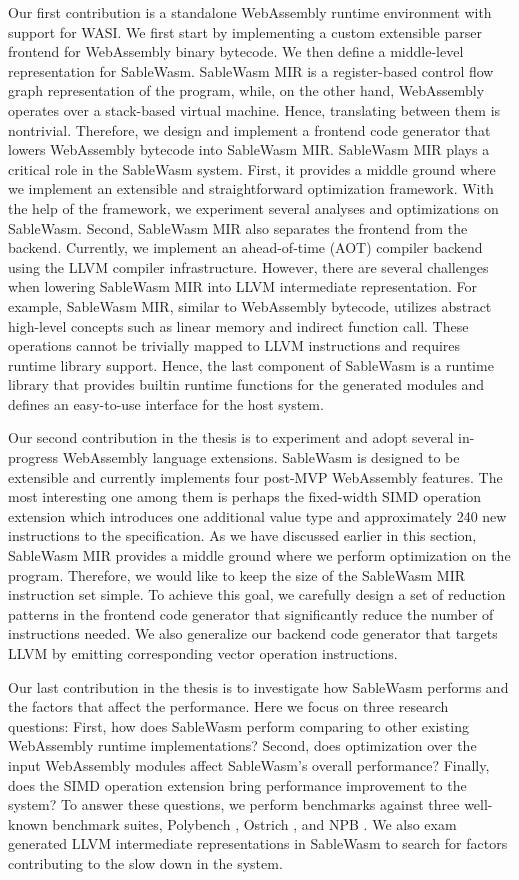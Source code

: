 Our first contribution is a standalone WebAssembly runtime environment with support for WASI. We first start by implementing a custom extensible parser frontend for WebAssembly binary bytecode. We then define a middle-level representation for SableWasm. SableWasm MIR is a register-based control flow graph representation of the program, while, on the other hand, WebAssembly operates over a stack-based virtual machine. Hence, translating between them is nontrivial. Therefore, we design and implement a frontend code generator that lowers WebAssembly bytecode into SableWasm MIR. SableWasm MIR plays a critical role in the SableWasm system. First, it provides a middle ground where we implement an extensible and straightforward optimization framework. With the help of the framework, we experiment several analyses and optimizations on SableWasm. Second, SableWasm MIR also separates the frontend from the backend. Currently, we implement an ahead-of-time (AOT) compiler backend using the LLVM compiler infrastructure. However, there are several challenges when lowering SableWasm MIR into LLVM intermediate representation. For example, SableWasm MIR, similar to WebAssembly bytecode, utilizes abstract high-level concepts such as linear memory and indirect function call. These operations cannot be trivially mapped to LLVM instructions and requires runtime library support. Hence, the last component of SableWasm is a runtime library that provides builtin runtime functions for the generated modules and defines an easy-to-use interface for the host system.

Our second contribution in the thesis is to experiment and adopt several in-progress WebAssembly language extensions. SableWasm is designed to be extensible and currently implements four post-MVP WebAssembly features. The most interesting one among them is perhaps the fixed-width SIMD operation extension which introduces one additional value type and approximately 240 new instructions to the specification. As we have discussed earlier in this section, SableWasm MIR provides a middle ground where we perform optimization on the program. Therefore, we would like to keep the size of the SableWasm MIR instruction set simple. To achieve this goal, we carefully design a set of reduction patterns in the frontend code generator that significantly reduce the number of instructions needed. We also generalize our backend code generator that targets LLVM by emitting corresponding vector operation instructions.

Our last contribution in the thesis is to investigate how SableWasm performs and the factors that affect the performance. Here we focus on three research questions: First, how does SableWasm perform comparing to other existing WebAssembly runtime implementations? Second, does optimization over the input WebAssembly modules affect SableWasm's overall performance? Finally, does the SIMD operation extension bring performance improvement to the system? To answer these questions, we perform benchmarks against three well-known benchmark suites, Polybench \cite{polybench}, Ostrich \cite{ostrich}, and NPB \cite{npb}. We also exam generated LLVM intermediate representations in SableWasm to search for factors contributing to the slow down in the system.

